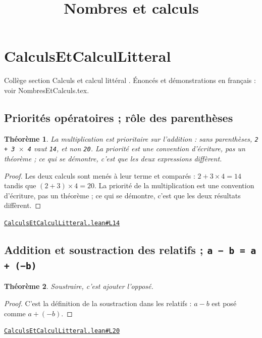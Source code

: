 \documentclass[11pt,a4paper]{article}
\title{Nombres et calculs}
\date{}
\theoremstyle{definition}
\theoremstyle{plain}
\newtheorem{theoreme}{Théorème}
\newcommand{\source}[2]{\par\smallskip\noindent\hfill{\footnotesize\href{#1}{\texttt{#2}}}\par\smallskip}
\begin{document}
\maketitle
\sloppy

\section{CalculsEtCalculLitteral}

\noindent
Collège \textemdash{} section \og{} Calculs et calcul littéral \fg{}.
Énoncés et démonstrations en français : voir NombresEtCalculs.tex.

\subsection{Priorités opératoires ; rôle des parenthèses}

\begin{theoreme}
La multiplication est prioritaire sur l'addition : sans parenthèses, \texttt{2 + 3 \(\times\) 4}
vaut \texttt{14}, et non \texttt{20}. La priorité est une convention d'écriture, pas un théorème ;
ce qui se démontre, c'est que les deux expressions diffèrent.
\end{theoreme}

\begin{proof}
Les deux calculs sont menés à leur terme et comparés : $2 + 3 \times 4 = 14$ tandis
que $(2+3) \times 4 = 20$. La priorité de la multiplication est une convention d'écriture,
pas un théorème ; ce qui se démontre, c'est que les deux résultats diffèrent.
\end{proof}
\source{https://github.com/Commutator-IO/learn-lean/blob/main/cours/01-college/01-nombres-et-calculs/CalculsEtCalculLitteral.lean\#L14}{CalculsEtCalculLitteral.lean\#L14}

\subsection{Addition et soustraction des relatifs ; \texttt{a − b = a + (−b)}}

\begin{theoreme}
Soustraire, c'est ajouter l'opposé.
\end{theoreme}

\begin{proof}
C'est la définition de la soustraction dans les relatifs : $a - b$ est posé comme
$a + (-b)$.
\end{proof}
\source{https://github.com/Commutator-IO/learn-lean/blob/main/cours/01-college/01-nombres-et-calculs/CalculsEtCalculLitteral.lean\#L20}{CalculsEtCalculLitteral.lean\#L20}
\end{document}
